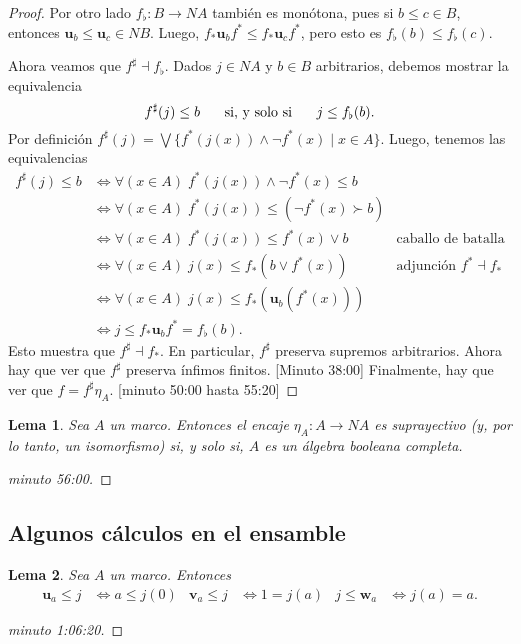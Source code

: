 \documentclass[12pt,letterpaper,titlepage]{article}
\newtheorem*{lemma}{Lema}
\theoremstyle{definition}
\renewcommand\sup{\vee}
\newcommand\Sup{\bigvee}
\renewcommand\inf{\wedge}
\newcommand\ssi{\hspace{5mm}\text{ si, y solo si }\hspace{5mm}}
\newcommand\unuc[1]{\mathbf u_{#1}}
\newcommand\vnuc[1]{\mathbf v_{#1}}
\newcommand\wnuc[1]{\mathbf w_{#1}}
\newcommand\<{\langle}
\renewcommand\>{\rangle}
\begin{document}
\begin{proof}
  Por otro lado $f_\flat:B\to NA$ también es monótona,
  pues si $b\leq c\in B$, entonces $\unuc b\leq\unuc c \in NB$.
  Luego, $f_*\unuc bf^*\leq f_*\unuc cf^*$, pero
  esto es $f_\flat(b)\leq f_\flat(c)$.

  Ahora veamos que $f^\sharp \dashv f_\flat$.
  Dados $j\in NA$ y $b\in B$ arbitrarios, debemos mostrar la
  equivalencia
  \[
    f^\sharp(j)\leq b \ssi j\leq f_\flat(b)
  .\]
  Por definición
  $f^\sharp(j)=\Sup\{f^*(j(x))\inf\neg f^*(x) \mid x\in A\}$.
  Luego, tenemos las equivalencias
  \begin{align*}
    f^\sharp(j) \leq b
    &\iff \forall(x\in A)\;f^*(j(x))\inf\neg f^*(x)\leq b \\
    &\iff \forall(x\in A)\;f^*(j(x))\leq (\neg f^*(x)\succ b) \\
    &\iff \forall(x\in A)\;f^*(j(x)) \leq f^*(x)\sup b
      & \text{caballo de batalla} \\
    &\iff \forall(x\in A)\;j(x) \leq f_*(b\sup f^*(x))
      & \text{adjunción } f^*\dashv f_* \\
    &\iff \forall(x\in A)\;j(x) \leq f_*(\unuc b(f^*(x))) \\
    &\iff j\leq f_*\unuc b f^* = f_\flat(b).
  \end{align*}
  Esto muestra que $f^\sharp\dashv f_*$.
  En particular, $f^\sharp$ preserva supremos arbitrarios.
  Ahora hay que ver que $f^\sharp$ preserva ínfimos finitos.
  [Minuto 38:00]
  Finalmente, hay que ver que $f=f^\sharp \eta_A$.
  [minuto 50:00 hasta 55:20]
\end{proof}

\begin{lemma}
  Sea $A$ un marco.
  Entonces el encaje $\eta_A:A\to NA$ es suprayectivo (y, por lo
  tanto, un isomorfismo) si, y solo
  si, $A$ es un álgebra booleana completa.
\end{lemma}
\begin{proof}
  [minuto 56:00]
\end{proof}

\subsection{Algunos cálculos en el ensamble}

\begin{lemma}
  Sea $A$ un marco.
  Entonces
  \begin{align*}
    \unuc a\leq j &\iff a\leq j(0) &
    \vnuc a\leq j &\iff 1=j(a) &
    j\leq \wnuc a &\iff j(a)=a.
  \end{align*}
\end{lemma}
\begin{proof}
  [minuto 1:06:20]
\end{proof}
\end{document}
